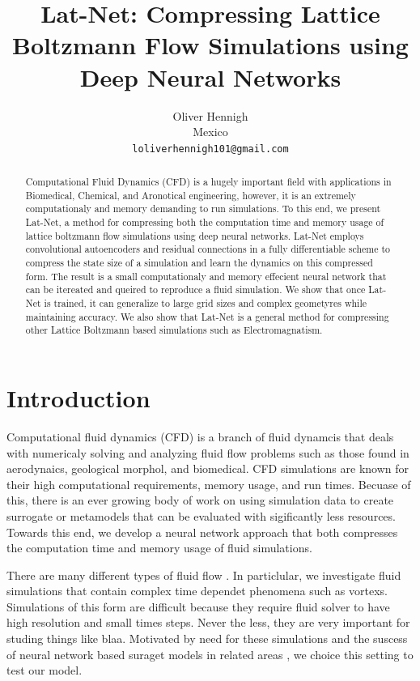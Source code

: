 \documentclass{article}
\title{Lat-Net: Compressing Lattice Boltzmann Flow Simulations using Deep Neural Networks}
\author{
  Oliver Hennigh \\
  Mexico \\
  \texttt{loliverhennigh101@gmail.com} \\
}
\begin{document}

\maketitle

\begin{abstract}
Computational Fluid Dynamics (CFD) is a hugely important field with applications in Biomedical, Chemical, and Aronotical engineering, however, it is an extremely computationaly and memory demanding to run simulations. To this end, we present Lat-Net, a method for compressing both the computation time and memory usage of lattice boltzmann flow simulations using deep neural networks. Lat-Net employs convolutional autoencoders and residual connections in a fully differentiable scheme to compress the state size of a simulation and learn the dynamics on this compressed form. The result is a small computationaly and memory effecient neural network that can be itereated and queired to reproduce a fluid simulation. We show that once Lat-Net is trained, it can generalize to large grid sizes and complex geometyres while maintaining accuracy. We also show that Lat-Net is a general method for compressing other Lattice Boltzmann based simulations such as Electromagnatism.

\end{abstract}

\section{Introduction}

Computational fluid dynamics (CFD) is a branch of fluid dynamcis that deals with numericaly solving and analyzing fluid flow problems such as those found in aerodynaics, geological morphol, and biomedical. CFD simulations are known for their high computational requirements, memory usage, and run times. Becuase of this, there is an ever growing body of work on using simulation data to create surrogate or metamodels that can be evaluated with sigificantly less resources. Towards this end, we develop a neural network approach that both compresses the computation time and memory usage of fluid simulations.

There are many different types of fluid flow . In particlular, we investigate fluid simulations that contain complex time dependet phenomena such as vortexs. Simulations of this form are difficult because they require fluid solver to have high resolution and small times steps. Never the less, they are very important for studing things like blaa. Motivated by need for these simulations and the suscess of neural network based suraget models in related areas \cite{tompson2016accelerating} \cite{guo2016convolutional}, we choice this setting to test our model.
\end{document}
